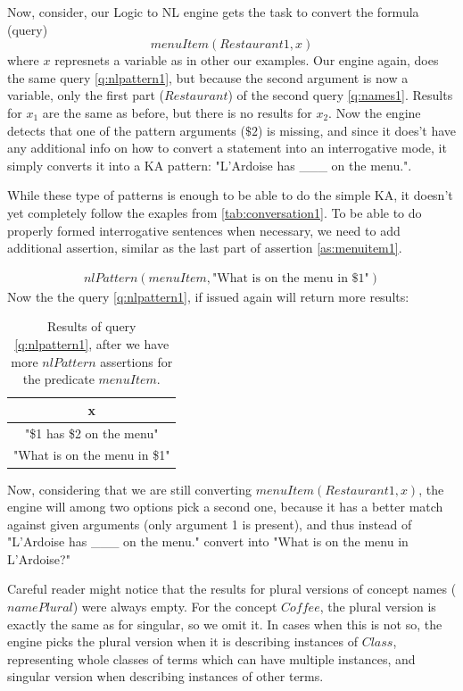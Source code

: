 Now, consider, our Logic to NL engine gets the task to convert the formula
(query)
\begin{equation}
menuItem(Restaurant1,x)
\end{equation}
where $x$ represnets a variable as in other our 
examples. Our engine again, does the same query \ref{q:nlpattern1}, but because
the second argument is now a variable, only the first part ($Restaurant$) of 
the second query \ref{q:names1}. Results for $x_1$ are the same as before,
but there is no results for $x_2$. Now the engine detects that one of the 
pattern arguments ($\$2$) is missing, and since it does't have any additional
info on how to convert a statement into an interrogative mode, it simply
converts it into a KA pattern: "L'Ardoise has \_\_\_ on the menu.".

While these type of patterns is enough to be able to do the simple KA, it
doesn't yet completely follow the exaples from \autoref{tab:conversation1}. To
be able to do properly formed interrogative sentences when necessary, we need
to add additional assertion, similar as the last part of assertion 
\ref{as:menuitem1}.

\begin{equation}\label{as:menuitem2}
\begin{gathered}
	nlPattern(menuItem, \text{"What is on the menu in \$1"})
\end{gathered}
\end{equation}
Now the the query \ref{q:nlpattern1}, if issued again will return more
results:
\begin{table}[H]
\centering
\caption{Results of query \ref{q:nlpattern1}, after we have more $nlPattern$ 
assertions for the predicate $menuItem$.}
\label{tab:results3}
\begin{tabular}{|c|}
	\hline
	\textbf{x} \\
    \hline
    "\$1 has \$2 on the menu" \\
    \hline
	"What is on the menu in \$1" \\
	\hline
\end{tabular}
\end{table}
Now, considering that we are still converting $menuItem(Restaurant1,x)$, the
engine will among two options pick a second one, because it has a better match
against given arguments (only argument 1 is present), and thus instead of
"L'Ardoise has \_\_\_ on the menu." convert into 
"What is on the menu in L'Ardoise?"

Careful reader might notice that the results for plural versions of concept 
names ($namePlural$) were always empty. For the concept $Coffee$, the plural
version is exactly the same as for singular, so we omit it. In cases when
this is not so, the engine picks the plural version when it is describing
instances of $Class$, representing whole classes of terms which can have 
multiple instances, and singular version when describing instances of
other terms.

